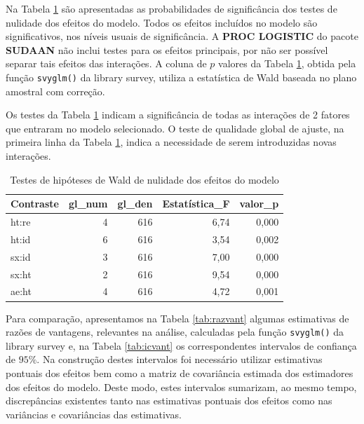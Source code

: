 \documentclass[]{book}
\theoremstyle{definition}
\theoremstyle{definition}
\theoremstyle{definition}
\theoremstyle{remark}
\begin{document}
Na Tabela \ref{tab:testmodlogit} são apresentadas as probabilidades de
significância dos testes de nulidade dos efeitos do modelo. Todos os
efeitos incluídos no modelo são significativos, nos níveis usuais de
significância. A \textbf{PROC LOGISTIC} do pacote \textbf{SUDAAN} não
inclui testes para os efeitos principais, por não ser possível separar
tais efeitos das interações. A coluna de \(p\) valores da Tabela
\ref{tab:testmodlogit}, obtida pela função \texttt{svyglm()} da library
survey, utiliza a estatística de Wald baseada no plano amostral com
correção.

Os testes da Tabela \ref{tab:testmodlogit} indicam a significância de
todas as interações de 2 fatores que entraram no modelo selecionado. O
teste de qualidade global de ajuste, na primeira linha da Tabela
\ref{tab:testmodlogit}, indica a necessidade de serem introduzidas novas
interações.

\begin{table}

\caption{\label{tab:testmodlogit}Testes de hipóteses de Wald de nulidade dos efeitos do modelo}
\centering
\begin{tabular}[t]{lrrrr}
\toprule
Contraste & gl\_num & gl\_den & Estatística\_F & valor\_p\\
\midrule
ht:re & 4 & 616 & 6,74 & 0,000\\
ht:id & 6 & 616 & 3,54 & 0,002\\
sx:id & 3 & 616 & 7,00 & 0,000\\
sx:ht & 2 & 616 & 9,54 & 0,000\\
ae:ht & 4 & 616 & 4,72 & 0,001\\
\bottomrule
\end{tabular}
\end{table}

Para comparação, apresentamos na Tabela \ref{tab:razvant} algumas
estimativas de razões de vantagens, relevantes na análise, calculadas
pela função \texttt{svyglm()} da library survey e, na Tabela
\ref{tab:icvant} os correspondentes intervalos de confiança de \(95\%\).
Na construção destes intervalos foi necessário utilizar estimativas
pontuais dos efeitos bem como a matriz de covariância estimada dos
estimadores dos efeitos do modelo. Deste modo, estes intervalos
sumarizam, ao mesmo tempo, discrepâncias existentes tanto nas
estimativas pontuais dos efeitos como nas variâncias e covariâncias das
estimativas.
\end{document}
